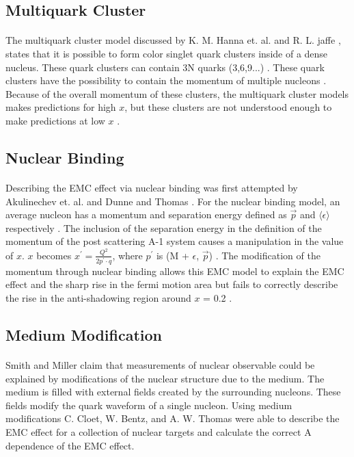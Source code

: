 \subsection{Multiquark Cluster}
\paragraph{} The multiquark cluster model discussed by K. M. Hanna et. al. \cite{EMC_multiQ} and R. L. jaffe \cite{EMC_multiQ_2}, states that it is possible to form color singlet quark clusters inside of a dense nucleus. These quark clusters can contain 3N quarks (3,6,9...) \cite{Norton}. These quark clusters have the possibility to contain the momentum of multiple nucleons \cite{Ajth}. Because of the overall momentum of these clusters, the multiquark cluster models makes predictions for high $x $, but these clusters are not understood enough to make predictions at low $x$ \cite{Geesaman, EMC_model_1, EMC_multiQ, Ajth}.  

\subsection{Nuclear Binding}
\paragraph{} Describing the EMC effect via nuclear binding was first attempted by Akulinechev et. al. \cite{EMC_binding_3} and Dunne and Thomas \cite{EMC_binding_2}. For the nuclear binding model, an average nucleon has a momentum and separation energy defined as $\vec{p}$ and $\langle \epsilon \rangle$ respectively \cite{Norton}. The inclusion of the separation energy in the definition of the momentum of the post scattering A-1 system causes a manipulation in the value of $x$. $x$ becomes $x^{\prime} = \frac{Q^2}{2p^{\prime}\cdot q}$, where $p^{\prime}$ is (M + $\epsilon$, $\vec{p}$) \cite{Norton}. The modification of the momentum through nuclear binding allows this EMC model to explain the EMC effect and the sharp rise in the fermi motion area but fails to correctly describe the rise in the anti-shadowing region around $x$ = 0.2 \cite{EMC_binding, EMC_model_1, Ajth}.

\subsection{Medium Modification}
\paragraph{} Smith and Miller \cite{EMC_medium_2} claim that measurements of nuclear observable could be explained by modifications of the nuclear structure due to the medium. The medium is filled with external fields created by the surrounding nucleons. These fields modify the quark waveform of a single nucleon. Using medium modifications C. Cloet, W. Bentz, and A. W. Thomas \cite{EMC_medium_1} were able to describe the EMC effect for a collection of nuclear targets and calculate the correct A dependence of the EMC effect. 


